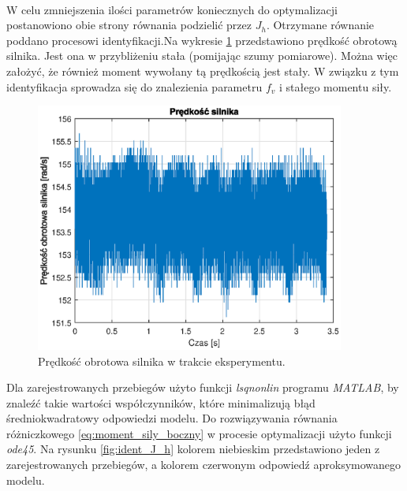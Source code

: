\documentclass[11pt,a4paper]{article}
\begin{document}
\paragraph*{}
W celu zmniejszenia ilości parametrów koniecznych do optymalizacji postanowiono obie strony równania podzielić przez \(J_h\). Otrzymane równanie poddano procesowi identyfikacji.Na wykresie \ref{fig:V_ident_J_h} przedstawiono prędkość obrotową silnika. Jest ona w przybliżeniu stała (pomijając szumy pomiarowe). Można więc założyć, że również moment wywołany tą prędkością jest stały. W związku z tym identyfikacja sprowadza się do znalezienia parametru \(f_v\) i stałego momentu siły.

\begin{figure}[H]
	\centering
	\includegraphics[width=4in]{Figures/V_ident_J_h.eps}
	\caption{Prędkość obrotowa silnika w trakcie eksperymentu.}
	\label{fig:V_ident_J_h}
\end{figure}

Dla zarejestrowanych przebiegów użyto funkcji \textit{lsqnonlin} programu \textit{MATLAB}, by znaleźć takie wartości współczynników, które minimalizują błąd średniokwadratowy odpowiedzi modelu. Do rozwiązywania równania różniczkowego \eqref{eq:moment_sily_boczny} w procesie optymalizacji użyto funkcji \textit{ode45}. Na rysunku \ref{fig:ident_J_h} kolorem niebieskim przedstawiono jeden z zarejestrowanych przebiegów, a kolorem czerwonym odpowiedź aproksymowanego modelu.
\end{document}
